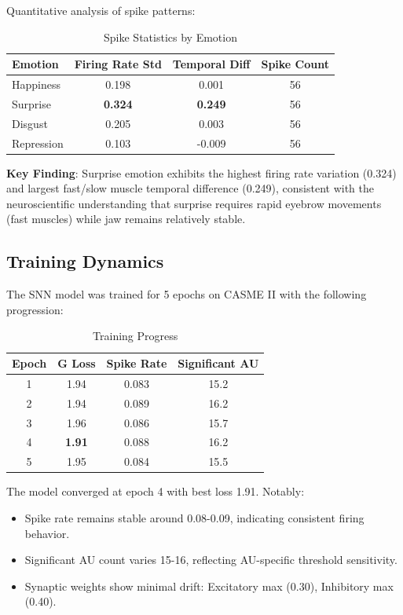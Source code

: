 Quantitative analysis of spike patterns:

\begin{table}[htbp]
\centering
\caption{Spike Statistics by Emotion}
\label{tab:spike_stats}
\begin{tabular}{lccc}
\toprule
Emotion & Firing Rate Std & Temporal Diff & Spike Count \\
\midrule
Happiness & 0.198 & 0.001 & 56 \\
Surprise & \textbf{0.324} & \textbf{0.249} & 56 \\
Disgust & 0.205 & 0.003 & 56 \\
Repression & 0.103 & -0.009 & 56 \\
\bottomrule
\end{tabular}
\end{table}

\textbf{Key Finding}: Surprise emotion exhibits the highest firing rate variation (0.324) and largest fast/slow muscle temporal difference (0.249), consistent with the neuroscientific understanding that surprise requires rapid eyebrow movements (fast muscles) while jaw remains relatively stable.

\subsection{Training Dynamics}

The SNN model was trained for 5 epochs on CASME II with the following progression:

\begin{table}[htbp]
\centering
\caption{Training Progress}
\label{tab:training}
\begin{tabular}{cccc}
\toprule
Epoch & G Loss & Spike Rate & Significant AU \\
\midrule
1 & 1.94 & 0.083 & 15.2 \\
2 & 1.94 & 0.089 & 16.2 \\
3 & 1.96 & 0.086 & 15.7 \\
4 & \textbf{1.91} & 0.088 & 16.2 \\
5 & 1.95 & 0.084 & 15.5 \\
\bottomrule
\end{tabular}
\end{table}

The model converged at epoch 4 with best loss 1.91. Notably:
\begin{itemize}
\item Spike rate remains stable around 0.08-0.09, indicating consistent firing behavior.
\item Significant AU count varies 15-16, reflecting AU-specific threshold sensitivity.
\item Synaptic weights show minimal drift: Excitatory max (0.30), Inhibitory max (0.40).
\end{itemize}

